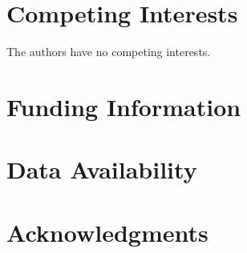 \documentclass[12pt, oneside]{article}   	%
\begin{document}
\section*{Competing Interests} \vspace{3mm} The authors have no competing interests. 
	
\section*{Funding Information} 
	
\section*{Data Availability} 
	
\section*{Acknowledgments} 



\end{document}

